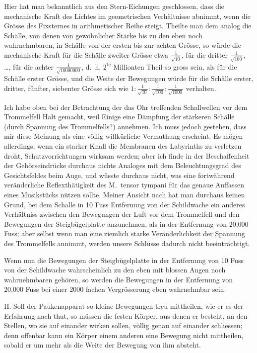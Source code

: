 \documentclass[12pt,a4paper]{article}
\begin{document}
Hier hat man bekanntlich aus den Stern-Eichungen geschlossen, dass die mechanische Kraft des Lichtes im geometrischen Verh\"altnisse abnimmt, wenn die Gr\"osse des Fixsternes in arithmetischer Reihe steigt. Theilte man dem analog die Sch\"alle, von denen von gew\"ohnlicher St\"arke bis zu den eben noch wahrnehmbaren, in Sch\"alle von der ersten bis zur achten Gr\"osse, so w\"urde die mechanische Kraft f\"ur die Sch\"alle zweiter Gr\"osse etwa $\frac{1}{\sqrt{10}}$, f\"ur die dritter $\frac{1}{\sqrt{100}}$, \ldots, f\"ur die achter $\frac{1}{\sqrt{10000000}}$, d.\ h. $2^{\text{te}}$ Millionten Theil so gross sein, als f\"ur die Sch\"alle erster Gr\"osse, und die Weite der Bewegungen w\"urde f\"ur die Sch\"alle erster, dritter, f\"unfter, siebenter Gr\"osse sich wie $1 : \frac{1}{\sqrt{10}} : \frac{1}{\sqrt{100}} : \frac{1}{\sqrt{1000}}$ verhalten.

Ich habe oben bei der Betrachtung der das Ohr treffenden Schallwellen vor dem Trommelfell Halt gemacht, weil Einige eine D\"ampfung der st\"arkeren Sch\"alle (durch Spannung des Trommelfells?) annehmen. Ich muss jedoch gestehen, dass mir diese Meinung als eine v\"ollig willk\"urliche Vermuthung erscheint. Es m\"ogen allerdings, wenn ein starker Knall die Membranen des Labyrinths zu verletzen droht, Schutzvorrichtungen wirksam werden; aber ich finde in der Beschaffenheit der Geh\"orseindr\"ucke durchaus nichts Analoges mit dem Beleuchtungsgrad des Gesichtsfeldes beim Auge, und w\"usste durchaus nicht, was eine fortw\"ahrend ver\"anderliche Reflexth\"atigkeit des M.~tensor tympani f\"ur das genaue Auffassen eines Musikst\"ucks n\"utzen sollte. Meiner Ansicht nach hat man durchaus keinen Grund, bei dem Schalle in 10 Fuss Entfernung von der Schildwache ein anderes Verh\"altniss zwischen den Bewegungen der Luft vor dem Trommelfell und den Bewegungen der Steigb\"ugelplatte anzunehmen, als in der Entfernung von 20{,}000 Fuss; aber selbst wenn man eine ziemlich starke Ver\"anderlichkeit der Spannung des Trommelfells annimmt, werden unsere Schl\"usse dadurch nicht beeintr\"achtigt.

Wenn nun die Bewegungen der Steigb\"ugelplatte in der Entfernung von 10 Fuss von der Schildwache wahrscheinlich zu den eben mit blossen Augen noch wahrnehmbaren geh\"oren, so werden die Bewegungen in der Entfernung von 20{,}000 Fuss bei einer 2000 fachen Vergr\"osserung eben wahrnehmbar sein.

II. Soll der Paukenapparat so kleine Bewegungen treu mittheilen, wie er es der Erfahrung nach thut, so m\"ussen die festen K\"orper, aus denen er besteht, an den Stellen, wo sie auf einander wirken sollen, v\"ollig genau auf einander schliessen; denn offenbar kann ein K\"orper einem anderen eine Bewegung nicht mittheilen, sobald er um mehr als die Weite der Bewegung von ihm absteht.
\end{document}
